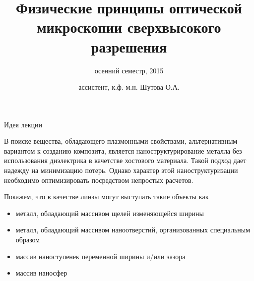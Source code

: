 \documentclass[9pt, compress, xcolor=table]{beamer}
\title{Физические принципы оптической микроскопии сверхвысокого разрешения}
\subtitle{осенний семестр, 2015}
\author{ассистент, к.ф.-м.н. Шутова О.А.}
\institute{МГУ им. М.В. Ломоносова, физический факультет}
\begin{document}
\maketitle


\begin{frame}{Идея лекции}

В поиске вещества, обладающего плазмонными свойствами, альтернативным вариантом к созданию композита, является наноструктурирование металла без использования диэлектрика в качетстве хостового материала. Такой подход дает надежду на минимизацию потерь. Однако характер этой наноструктуризации необходимо оптимизировать посредством непростых расчетов. 

Покажем, что в качестве линзы могут выступать такие объекты как
\begin{itemize}
\item металл, обладающий массивом щелей изменяющейся ширины
\item металл, обладающий массивом наноотверстий, организованных специальным образом
\item массив наноступенек переменной ширины и/или зазора
\item массив наносфер
\end{itemize}

\end{frame}
\end{document}
